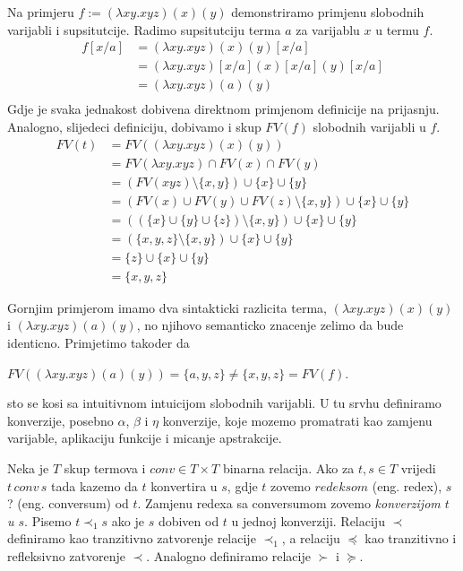 \begin{example}
  Na primjeru $f := (\lambda x y . x y z) (x) (y)$ demonstriramo primjenu slobodnih varijabli i supsitutcije.
  Radimo supsitutciju terma $a$ za varijablu $x$ u termu $f$.
  \begin{align*}
    f[x/a]  &= (\lambda x y . x y z) (x) (y) [x/a] \\
            &= (\lambda x y . x y z)[x/a] (x)[x/a] (y) [x/a] \\ 
            &= (\lambda x y . x y z ) (a) (y) \\ 
  \end{align*}
  Gdje je svaka jednakost dobivena direktnom primjenom definicije na prijasnju. Analogno, slijedeci definiciju, dobivamo i skup $FV(f)$ slobodnih varijabli u $f$.
  \begin{align*}
    FV(t) &= FV((\lambda x y . x y z) (x) (y)) \\
          &= FV(\lambda x y . x y z) \cap FV(x) \cap FV(y) \\
          &= (FV(x y z) \setminus \{x, y\}) \cup \{x\} \cup \{y\} \\
          &= (FV(x) \cup FV(y) \cup FV(z) \setminus \{x, y\}) \cup \{x\} \cup \{y\} \\
          &= ((\{x\} \cup \{y\} \cup \{z\}) \setminus \{x, y\}) \cup \{x\} \cup \{y\} \\
          &= (\{x, y, z\}\setminus \{x, y\}) \cup \{x\} \cup \{y\} \\
          &= \{z\} \cup \{x\} \cup \{y\} \\
          &= \{x, y, z\}
  \end{align*}
\end{example}

Gornjim primjerom imamo dva sintakticki razlicita terma, $ (\lambda x y . x y z) (x) (y)$ i  $(\lambda x y . x y z) (a) (y)$, no njihovo semanticko znacenje zelimo da bude identicno. Primjetimo takoder da
\begin{center}
$FV((\lambda x y . x y z) (a) (y)) = \{a, y, z\} \neq \{x, y, z\} = FV(f)$.
\end{center}

sto se kosi sa intuitivnom intuicijom slobodnih varijabli. U tu srvhu definiramo konverzije, posebno $\alpha$, $\beta$ i $\eta$ konverzije, koje mozemo promatrati kao zamjenu varijable, aplikaciju funkcije i micanje apstrakcije. 

\begin{definition}[Konverzija]
  Neka je $T$ skup termova i $conv \in T \times T$ binarna relacija. Ako za $t, s \in T$ vrijedi $t\, conv\, s$ tada kazemo da $t$ konvertira u $s$, gdje $t$ zovemo $redeksom$ (eng. redex), $s$  ? (eng. conversum) od $t$. Zamjenu redexa sa conversumom zovemo \emph{konverzijom $t$ u $s$}. Pisemo $t \prec_1 s$ ako je $s$ dobiven od $t$ u jednoj konverziji. Relaciju $\prec$ definiramo kao tranzitivno zatvorenje relacije $\prec_1$, a relaciju $\preceq$ kao tranzitivno i refleksivno zatvorenje $\prec$. Analogno definiramo relacije $\succ$ i $\succeq$.
\end{definition}

